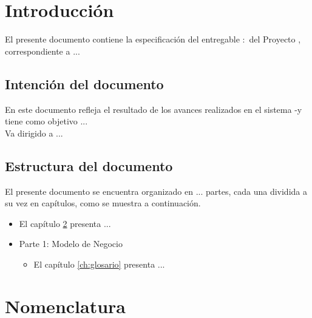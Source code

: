\chapter{Introducción}
\label{ch:introduccion}

    El presente documento contiene la especificación del entregable \varCveEntregable:\varEntregable\ del Proyecto \varProyecto, correspondiente a ...

    \section{Intención del documento}

        En este documento refleja el resultado de los avances realizados en el sistema \varCveSistema-\varSistema y tiene como objetivo ...\\

        Va dirigido a ...

    \section{Estructura del documento}

        El presente documento se encuentra organizado en ... partes, cada una dividida a su vez en capítulos, como se muestra a continuación.

        \begin{itemize}
	        \item El capítulo \ref{ch:nomenclatura} presenta ...
	        \item Parte 1: Modelo de Negocio
		        \begin{itemize}
			        \item El capítulo \ref{ch:glosario} presenta ...
		        \end{itemize}
        \end{itemize}
	
\chapter{Nomenclatura}
\label{ch:nomenclatura}
    
